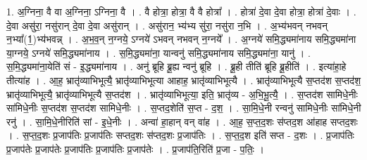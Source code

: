 \documentclass[17pt]{extarticle}
\begin{document}
1. अ॒ग्निना॒ वै वा अ॒ग्निना॒ ऽग्निना॒ वै । . वै होत्रा॒ होत्रा॒ वै वै होत्रा᳚ । . होत्रा॑ दे॒वा दे॒वा होत्रा॒ होत्रा॑ दे॒वाः । . दे॒वा असु॑रा॒ नसु॑रान् दे॒वा दे॒वा असु॑रान् । . असु॑रान॒ भ्य॑भ्य सु॑रा॒ नसु॑रा न॒भि । . अ॒भ्य॑भवन् नभवन् न॒भ्या᳚(1॒)भ्य॑भवन्न् । . अ॒भ॒व॒न् न॒ग्नये॒ ऽग्नये॑ ऽभवन् नभवन् न॒ग्नये᳚ । . अ॒ग्नये॑ समि॒द्ध्यमा॑नाय समि॒द्ध्यमा॑ना या॒ग्नये॒ ऽग्नये॑ समि॒द्ध्यमा॑नाय । . स॒मि॒द्ध्यमा॑ना॒ यान्वनु॑ समि॒द्ध्यमा॑नाय समि॒द्ध्यमा॑ना॒ यानु॑ । . स॒मि॒द्ध्यमा॑ना॒येति॑ सं - इ॒द्ध्यमा॑नाय । . अनु॑ ब्रूहि ब्रू॒ह्य न्वनु॑ ब्रूहि । . ब्रू॒ही तीति॑ ब्रूहि ब्रू॒हीति॑ । . इत्या॑हा॒हे तीत्या॑ह । . आ॒ह॒ भ्रातृ॑व्याभिभूत्यै॒ भ्रातृ॑व्याभिभूत्या आहाह॒ भ्रातृ॑व्याभिभूत्यै । . भ्रातृ॑व्याभिभूत्यै स॒प्तद॑श स॒प्तद॑श॒ भ्रातृ॑व्याभिभूत्यै॒ भ्रातृ॑व्याभिभूत्यै स॒प्तद॑श । . भ्रातृ॑व्याभिभूत्या॒ इति॒ भ्रातृ॑व्य - अ॒भि॒भू॒त्यै॒ । . स॒प्तद॑श सामिधे॒नीः सा॑मिधे॒नीः स॒प्तद॑श स॒प्तद॑श सामिधे॒नीः । . स॒प्तद॒शेति॑ स॒प्त - द॒श॒ । . सा॒मि॒धे॒नी रन्वनु॑ सामिधे॒नीः सा॑मिधे॒नी रनु॑ । . सा॒मि॒धे॒नीरिति॑ सां - इ॒धे॒नीः । . अन्वा॑ हा॒हान् वन् वा॑ह । . आ॒ह॒ स॒प्त॒द॒शः स॑प्तद॒श आ॑हाह सप्तद॒शः । . स॒प्त॒द॒शः प्र॒जाप॑तिः प्र॒जाप॑तिः सप्तद॒शः स॑प्तद॒शः प्र॒जाप॑तिः । . स॒प्त॒द॒श इति॑ सप्त - द॒शः । . प्र॒जाप॑तिः प्र॒जाप॑तेः प्र॒जाप॑तेः प्र॒जाप॑तिः प्र॒जाप॑तिः प्र॒जाप॑तेः । . प्र॒जाप॑ति॒रिति॑ प्र॒जा - प॒तिः॒ । \newline
\end{document}
